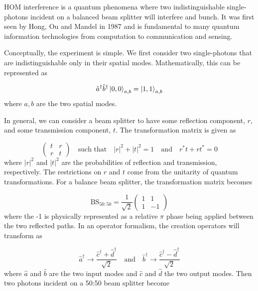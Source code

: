 \Ac{HOM} interference is a quantum phenomena where two indistinguishable single-photons incident on a balanced beam splitter will interfere and bunch. It was first seen by Hong, Ou and Mandel in 1987 \cite{HOM} and is fundamental to many quantum information technologies from computation to communication and sensing. 

Conceptually, the experiment is simple. We first consider two single-photons that are indistinguishable only in their spatial modes. Mathematically, this can be represented as 

\begin{equation}
	\hat{a}^\dagger \hat{b}^\dagger \ket{0,0}_{a,b} = \ket{1,1}_{a,b}
\end{equation}
where $a,b$ are the two spatial modes.

In general, we can consider a beam splitter to have some reflection component, $r$, and some transmission component, $t$. The transformation matrix is given as 

\begin{equation}
	\left(
	\begin{matrix}
		t & r \\
		r & t
	\end{matrix}
	\right)
	\quad\text{such that}\quad
	|r|^2 + |t|^2 = 1 
	\quad\text{and}\quad
	r^\ast t + r t^\ast = 0
\end{equation}
where $|r|^2$ and $|t|^2$ are the probabilities of reflection and transmission, respectively. The restrictions on $r$ and $t$ come from the unitarity of quantum transformations. For a balance beam splitter, the transformation matrix becomes

\begin{equation}
	\text{BS}_{50:50} = \frac{1}{\sqrt{2}}
	\left(
	\begin{matrix}
		1 & 1 \\
		1 & -1
	\end{matrix}
	\right)	
\end{equation}
where the {-1} is physically represented as a relative $\pi$ phase being applied between the two reflected paths. In an operator formalism, the creation operators will transform as

\begin{equation}
	\hat{a}^\dagger \rightarrow \frac{\hat{c}^\dagger + \hat{d}^\dagger}{\sqrt{2}} \quad \text{and} \quad \hat{b}^\dagger \rightarrow \frac{\hat{c}^\dagger - \hat{d}^\dagger}{\sqrt{2}}
\end{equation}
where $\hat{a}$ and $\hat{b}$ are the two input modes and $\hat{c}$ and $\hat{d}$ the two output modes. Then two photons incident on a {50:50} beam splitter become

